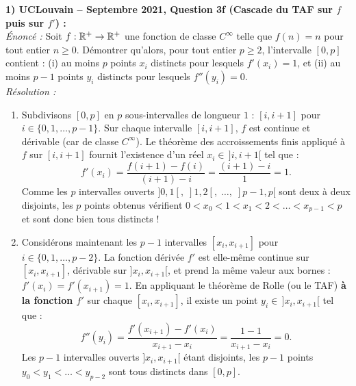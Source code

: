 \begin{exemple}
\textbf{1) UCLouvain -- Septembre 2021, Question 3f (Cascade du TAF sur $f$ puis sur $f'$) :}\\
\emph{Énoncé :} Soit $f : \mathbb{R}^+ \to \mathbb{R}^+$ une fonction de classe $C^\infty$ telle que $f(n) = n$ pour tout entier $n \ge 0$. Démontrer qu'alors, pour tout entier $p \ge 2$, l'intervalle $[0, p]$ contient : (i) au moins $p$ points $x_i$ distincts pour lesquels $f'(x_i) = 1$, et (ii) au moins $p - 1$ points $y_i$ distincts pour lesquels $f''(y_i) = 0$.\\
\emph{Résolution :}
\begin{enumerate}[label=(\roman*)]
    \item Subdivisons $[0, p]$ en $p$ sous-intervalles de longueur $1$ : $[i, i+1]$ pour $i \in \{0, 1, \dots, p-1\}$. Sur chaque intervalle $[i, i+1]$, $f$ est continue et dérivable (car de classe $C^\infty$). Le théorème des accroissements finis appliqué à $f$ sur $[i, i+1]$ fournit l'existence d'un réel $x_i \in \,]i, i+1[$ tel que :
    \[
        f'(x_i) = \frac{f(i+1) - f(i)}{(i+1) - i} = \frac{(i+1) - i}{1} = 1.
    \]
    Comme les $p$ intervalles ouverts $]0, 1[,\; ]1, 2[,\; \dots,\; ]p-1, p[$ sont deux à deux disjoints, les $p$ points obtenus vérifient $0 < x_0 < 1 < x_1 < 2 < \dots < x_{p-1} < p$ et sont donc bien tous distincts !
    \item Considérons maintenant les $p-1$ intervalles $[x_i, x_{i+1}]$ pour $i \in \{0, 1, \dots, p-2\}$. La fonction dérivée $f'$ est elle-même continue sur $[x_i, x_{i+1}]$, dérivable sur $]x_i, x_{i+1}[$, et prend la même valeur aux bornes : $f'(x_i) = f'(x_{i+1}) = 1$. En appliquant le théorème de Rolle (ou le TAF) \textbf{à la fonction $f'$} sur chaque $[x_i, x_{i+1}]$, il existe un point $y_i \in \,]x_i, x_{i+1}[$ tel que :
    \[
        f''(y_i) = \frac{f'(x_{i+1}) - f'(x_i)}{x_{i+1} - x_i} = \frac{1 - 1}{x_{i+1} - x_i} = 0.
    \]
    Les $p-1$ intervalles ouverts $]x_i, x_{i+1}[$ étant disjoints, les $p-1$ points $y_0 < y_1 < \dots < y_{p-2}$ sont tous distincts dans $[0, p]$.
\end{enumerate}


\end{exemple}
